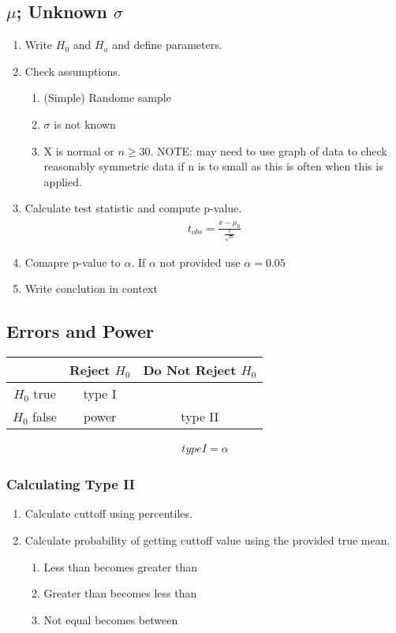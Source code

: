 \subsection{$\mu$; Unknown $\sigma$}
\begin{enumerate}
\item Write $H_0$ and $H_a$ and define parameters.
\item Check assumptions.
  \begin{enumerate}
  \item (Simple) Randome sample
  \item $\sigma$ is not known
  \item X is normal or $n \geq 30$. NOTE: may need to use graph of data to check reasonably symmetric data if n is to small as this is often when this is applied.
  \end{enumerate}
\item Calculate test statistic and compute p-value.
  \begin{align}
    t_{obs} = \frac{\overbar{x} - \mu_0}{\frac{s}{\sqrt{n}}}
  \end{align}
\item Comapre p-value to $\alpha$. If $\alpha$ not provided use $\alpha = 0.05$
\item Write conclution in context
\end{enumerate}

\subsection{Errors and Power}
\begin{center}
  \begin{tabular}{|c|c|c|}
    \hline
    & Reject $H_0$ & Do Not Reject $H_0$ \\
    \hline
    $H_0$ true & type I & \\
    \hline
    $H_0$ false & power & type II \\
    \hline
  \end{tabular}
\end{center}

\begin{align}
  type I = \alpha
\end{align}

\subsubsection{Calculating Type II}
\begin{enumerate}
\item Calculate cuttoff using percentiles.
\item Calculate probability of getting cuttoff value using the provided true mean.
  \begin{enumerate}
  \item Less than becomes greater than
  \item Greater than becomes less than
  \item Not equal becomes between
  \end{enumerate}
\end{enumerate}
